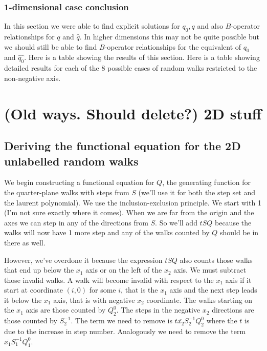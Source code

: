\documentclass[12pt]{article}
\theoremstyle{definition} \newtheorem{definition}[theorem]{Definition}
\newcommand{\ol}[1]{\overline{#1}}
\newcommand{\wh}{\widehat}
\begin{document}
\subsubsection{1-dimensional case conclusion}
In this section we were able to find explicit solutions for $q_0, q$ and also $B$-operator relationships for $q$ and $\wh q$. In higher dimensions this may not be quite possible but we should still be able to find $B$-operator relationships for the equivalent of $q_0$ and $\wh{q_0}$. Here is a table showing the results of this section. Here is a table showing detailed results for each of the 8 possible cases of random walks restricted to the non-negative axis.

\section{(Old ways. Should delete?) 2D stuff}

\subsection{Deriving the functional equation for the 2D unlabelled random walks}

We begin constructing a functional equation for $Q$, the generating function for the quarter-plane walks with steps from $S$ (we'll use it for both the step set and the laurent polynomial). We use the inclusion-exclusion principle. We start with 1 (I'm not sure exactly where it comes). When we are far from the origin and the axes we can step in any of the directions from $S$. So we'll add $tSQ$ because the walks will now have 1 more step and any of the walks counted by $Q$ should be in there as well.

However, we've overdone it because the expression $tSQ$ also counts those walks that end up below the $x_1$ axis or on the left of the $x_2$ axis. We must subtract those invalid walks. A walk will become invalid with respect to the $x_1$ axis if it start at coordinate $(i,0)$ for some $i$, that is the $x_1$ axis and the next step leads it below the $x_1$ axis, that is with negative $x_2$ coordinate. The walks starting on the $x_1$ axis are those counted by $Q_2^0$. The steps in the negative $x_2$ directions are those counted by $S_2^{-1}$. The term we need to remove is $t\ol{x_2}S_2^{-1}Q_2^0$ where the $t$ is due to the increase in step number. Analogously we need to remove the term $\ol{x_1}S_1^{-1}Q_1^0$.
\end{document}
